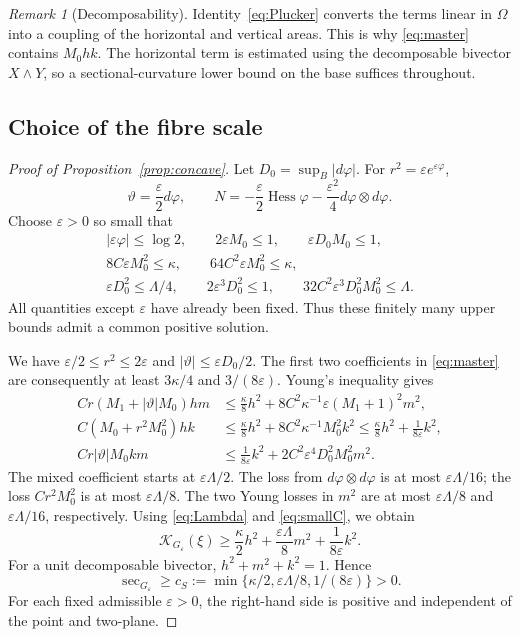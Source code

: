 \documentclass[12pt]{amsart}
\numberwithin{equation}{section}
\theoremstyle{remark}
\newtheorem{remark}[theorem]{Remark}
\newcommand{\eps}{\varepsilon}
\newcommand{\Hess}{\operatorname{Hess}}
\newcommand{\Ksec}{\operatorname{sec}}
\newcommand{\cK}{\mathcal K}
\begin{document}
\begin{remark}[Decomposability]\label{rem:decomposability}
Identity~\eqref{eq:Plucker} converts the terms linear in \(\Omega\)
into a coupling of the horizontal and vertical areas. This is why
\eqref{eq:master} contains \(M_0hk\). The horizontal term is
estimated using the decomposable bivector \(X\wedge Y\), so a
sectional-curvature lower bound on the base suffices throughout.
\end{remark}

\subsection{Choice of the fibre scale}
\begin{proof}[Proof of Proposition~\ref{prop:concave}]
Let \(D_0=\sup_B|d\varphi|\). For \(r^2=\eps e^{\eps\varphi}\),
\[
\vartheta=\frac\eps2d\varphi,\qquad
N=-\frac\eps2\Hess\varphi
        -\frac{\eps^2}{4}d\varphi\otimes d\varphi.
\]
Choose \(\eps>0\) so small that
\begin{gather}
|\eps\varphi|\le\log2,\qquad
2\eps M_0\le1,\qquad \eps D_0M_0\le1,
\label{eq:smallA}\\
8C\eps M_0^2\le\kappa,\qquad
64C^2\eps M_0^2\le\kappa,
\label{eq:smallB}\\
\eps D_0^2\le\Lambda/4,\qquad
2\eps^3D_0^2\le1,\qquad
32C^2\eps^3D_0^2M_0^2\le\Lambda.
\label{eq:smallC}
\end{gather}
All quantities except \(\eps\) have already been fixed. Thus these
finitely many upper bounds admit a common positive solution.

We have \(\eps/2\le r^2\le2\eps\) and \(|\vartheta|\le\eps D_0/2\).
The first two coefficients in \eqref{eq:master} are consequently at
least \(3\kappa/4\) and \(3/(8\eps)\). Young's inequality gives
\begin{align*}
Cr(M_1+|\vartheta|M_0)hm
 &\le\frac\kappa8h^2+
       8C^2\kappa^{-1}\eps(M_1+1)^2m^2,\\
C(M_0+r^2M_0^2)hk
 &\le\frac\kappa8h^2+
       8C^2\kappa^{-1}M_0^2k^2
 \le\frac\kappa8h^2+\frac1{8\eps}k^2,\\
Cr|\vartheta|M_0km
 &\le\frac1{8\eps}k^2+
       2C^2\eps^4D_0^2M_0^2m^2.
\end{align*}
The mixed coefficient starts at \(\eps\Lambda/2\).
The loss from \(d\varphi\otimes d\varphi\) is at most
\(\eps\Lambda/16\); the loss \(Cr^2M_0^2\) is at most
\(\eps\Lambda/8\). The two Young losses in \(m^2\) are at most
\(\eps\Lambda/8\) and \(\eps\Lambda/16\), respectively.
Using \eqref{eq:Lambda} and \eqref{eq:smallC}, we obtain
\begin{equation}\label{eq:reserve}
\cK_{G_\eps}(\xi)\ge
 \frac\kappa2h^2+\frac{\eps\Lambda}{8}m^2
                  +\frac1{8\eps}k^2.
\end{equation}
For a unit decomposable bivector, \(h^2+m^2+k^2=1\). Hence
\begin{equation}\label{eq:southlowerbound}
 \Ksec_{G_\eps}\ge
 c_S:=\min\{\kappa/2,\eps\Lambda/8,1/(8\eps)\}>0.
\end{equation}
For each fixed admissible \(\eps>0\), the right-hand side is positive
and independent of the point and two-plane.
\end{proof}
\end{document}
